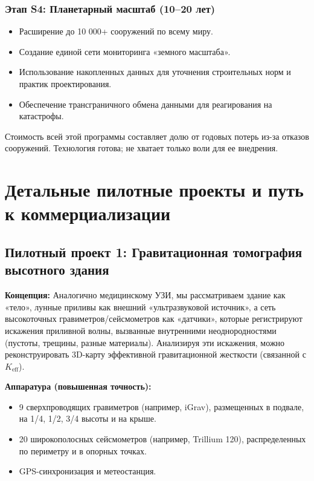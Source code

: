 \documentclass[12pt,a4paper]{article}
\theoremstyle{remark}
\newcommand{\Keff}{K_{\mathrm{eff}}}
\begin{document}
	\subsubsection{Этап S4: Планетарный масштаб (10–20 лет)}
	
	\begin{itemize}
		\item Расширение до 10 000+ сооружений по всему миру.
		\item Создание единой сети мониторинга «земного масштаба».
		\item Использование накопленных данных для уточнения строительных норм и практик проектирования.
		\item Обеспечение трансграничного обмена данными для реагирования на катастрофы.
	\end{itemize}
	
	Стоимость всей этой программы составляет долю от годовых потерь из-за отказов сооружений. Технология готова; не хватает только воли для ее внедрения.
	
	\section{Детальные пилотные проекты и путь к коммерциализации}
	
	\subsection{Пилотный проект 1: Гравитационная томография высотного здания}
	
	\textbf{Концепция:} Аналогично медицинскому УЗИ, мы рассматриваем здание как «тело», лунные приливы как внешний «ультразвуковой источник», а сеть высокоточных гравиметров/сейсмометров как «датчики», которые регистрируют искажения приливной волны, вызванные внутренними неоднородностями (пустоты, трещины, разные материалы). Анализируя эти искажения, можно реконструировать 3D-карту эффективной гравитационной жесткости (связанной с $\Keff$).
	
	\textbf{Аппаратура (повышенная точность):}
	\begin{itemize}
		\item 9 сверхпроводящих гравиметров (например, iGrav), размещенных в подвале, на 1/4, 1/2, 3/4 высоты и на крыше.
		\item 20 широкополосных сейсмометров (например, Trillium 120), распределенных по периметру и в опорных точках.
		\item GPS-синхронизация и метеостанция.
	\end{itemize}
	
\end{document}
